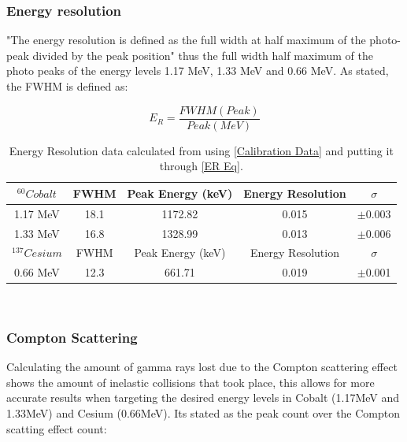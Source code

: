 \documentclass[12pt]{article}
\begin{document}
\subsubsection{Energy resolution}
\label{Energy Resolution SubsubSection}

"The energy resolution is defined as the full width at half maximum of the photo-peak divided by the peak position" \cite{Exp.C-2020} thus the full width half maximum of the photo peaks of the energy levels 1.17 MeV, 1.33 MeV and 0.66 MeV. As stated, the FWHM is defined as:

\begin{equation}
E_R = \dfrac{FWHM (Peak)}{Peak (MeV)}
\label{ER Eq}
\end{equation} 

\begin{table}[H]
\begin{center}
 \footnotesize
 \begin{tabular}{|c||c|c|c|c|}
 \hline
  $^{60}Cobalt$ & FWHM & Peak Energy (keV) & Energy Resolution & $\sigma$ \\
 \hline 
  1.17 MeV & 18.1 & 1172.82 & 0.015 & $\pm$0.003 \\
 \hline
  1.33 MeV & 16.8 & 1328.99 & 0.013 & $\pm$0.006 \\
 \hline \hline
  $^{137}Cesium$ & FWHM & Peak Energy (keV) & Energy Resolution & $\sigma$ \\
 \hline
 0.66 MeV & 12.3 & 661.71 & 0.019 & $\pm$0.001 \\
 \hline 
 \end{tabular} \\ 
 \caption{Energy Resolution data calculated from using \cref{Calibration Data} and putting it through \cref{ER Eq}. }
 \label{ER Data}
\end{center}
\end{table}

\subsubsection{Compton Scattering}
\label{Compton Scattering SubsubSection}

Calculating the amount of gamma rays lost due to the Compton scattering effect shows the amount of inelastic collisions that took place, this allows for more accurate results when targeting the desired energy levels in Cobalt (1.17MeV and 1.33MeV) and Cesium (0.66MeV). Its stated as the peak count over the Compton scatting effect count:
\end{document}
